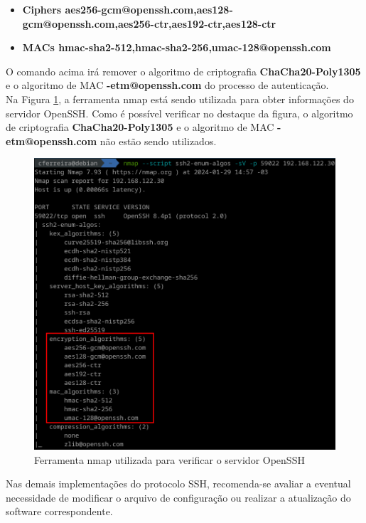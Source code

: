 \documentclass[12pt]{article}
\begin{document}
\begin{itemize}
	\item \small \textbf{Ciphers aes256-gcm@openssh.com,aes128-gcm@openssh.com,aes256-ctr,aes192-ctr,aes128-ctr}
	\item \small \textbf{MACs hmac-sha2-512,hmac-sha2-256,umac-128@openssh.com}
\end{itemize}

O comando acima irá remover o algoritmo de criptografia \textbf{ChaCha20-Poly1305} e o algoritmo de MAC \textbf{-etm@openssh.com} do processo de autenticação.\\

Na Figura \ref{fig:terrapin_depois}, a ferramenta nmap está sendo utilizada para obter informações do servidor OpenSSH. Como é possível verificar no destaque da figura, o algoritmo de criptografia \textbf{ChaCha20-Poly1305} e o algoritmo de MAC \textbf{-etm@openssh.com} não estão sendo utilizados.

\begin{figure}[H]
	\centering
	\includegraphics[scale=0.63]{terrapin_depois.png}
	\caption{Ferramenta nmap utilizada para verificar o servidor OpenSSH}
	\label{fig:terrapin_depois}
\end{figure}

Nas demais implementações do protocolo SSH, recomenda-se avaliar a eventual necessidade de modificar o arquivo de configuração ou realizar a atualização do software correspondente.
\end{document}
